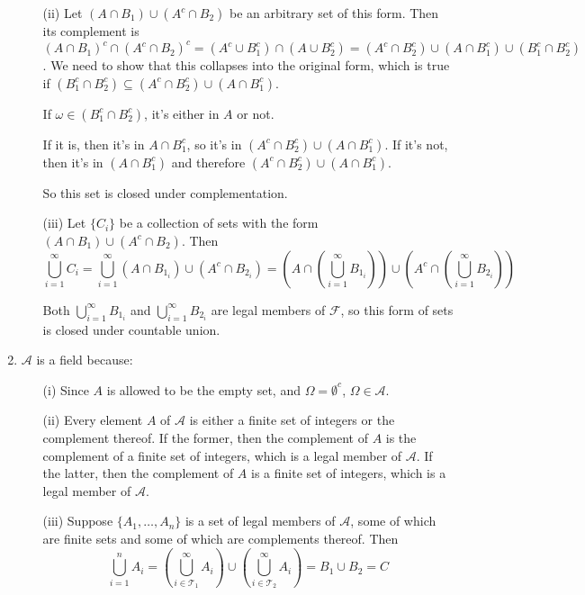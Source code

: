 \documentclass[12pt]{article}
\begin{document}
\begin{enumerate}
\begin{itemize}
\item[(ii)] Let $(A \cap B_1)\cup(A^c \cap B_2)$
 be an arbitrary set of this form. Then its complement is $(A \cap B_1)^c \cap (A^c \cap B_2)^c = (A^c \cup B_1^c) \cap (A \cup B_2^c)=(A^c \cap B_2^c) \cup (A \cap B_1^c) \cup (B_1^c \cap B_2^c)$. We need to show that this collapses into the original form, which is true if $(B_1^c \cap B_2^c) \subseteq (A^c \cap B_2^c) \cup (A \cap B_1^c)$.
 
If $\omega \in (B_1^c \cap B_2^c)$, it's either in $A$ or not. 

If it is, then it's in $A\cap B_1^c$, so it's in $(A^c \cap B_2^c) \cup (A \cap B_1^c)$. If it's not, then it's in $(A \cap B_1^c)$ and therefore $(A^c \cap B_2^c) \cup (A \cap B_1^c)$.

So this set is closed under complementation.
 
\item[(iii)] Let $\{C_i\}$ be a collection of sets with the form $(A \cap B_1)\cup(A^c \cap B_2)$. Then $$\bigcup^\infty_{i=1}C_i=\bigcup^\infty_{i=1}(A \cap B_{1_i})\cup(A^c \cap B_{2_i})= \left( A \cap \left(\bigcup^\infty_{i=1} B_{1_i} \right) \right)\cup \left( A^c \cap \left(\bigcup^\infty_{i=1} B_{2_i} \right) \right)$$

Both $\bigcup^\infty_{i=1} B_{1_i}$ and $\bigcup^\infty_{i=1} B_{2_i}$ are legal members of $\mathcal{F}$, so this form of sets is closed under countable union.

\end{itemize}

\item $\mathcal{A}$ is a field because:

\begin{itemize}
\item[(i)] Since $A$ is allowed to be the empty set, and $\Omega = \emptyset^c$, $\Omega \in \mathcal{A}$.
\item[(ii)] Every element $A$ of $\mathcal{A}$ is either a finite set of integers or the complement thereof. If the former, then the complement of $A$ is the complement of a finite set of integers, which is a legal member of $\mathcal{A}$. If the latter, then the complement of $A$ is a finite set of integers, which is a legal member of $\mathcal{A}$.
\item[(iii)] Suppose $\{A_1,\dots, A_n \}$ is a set of legal members of $\mathcal{A}$, some of which are finite sets and some of which are complements thereof. Then $$\bigcup^n_{i=1} A_i= \left(\bigcup^\infty_{i \in \mathcal{T}_1} A_i \right) \cup \left(\bigcup^\infty_{i \in \mathcal{T}_2} A_i \right)=B_1 \cup B_2 = C$$ 


\end{itemize}
\end{enumerate}
\end{document}
